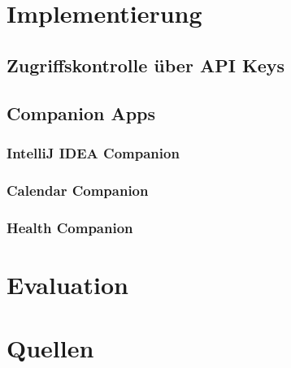 \documentclass[12pt,a4paper]{report}
\begin{document}
\chapter{Implementierung}
\section{Zugriffskontrolle über API Keys}
\section{Companion Apps}
\subsection{IntelliJ IDEA Companion}
\subsection{Calendar Companion}
\subsection{Health Companion}

\chapter{Evaluation}

\chapter{Quellen}
\end{document}
